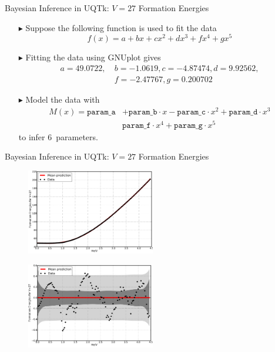 \documentclass[10pt]{beamer}
\begin{document}
\begin{frame}{Bayesian Inference in UQTk: $V = 27$ Formation Energies}
	\large
	    \begin{itemize}
    	\item[$\blacktriangleright$] Suppose the following function is used to fit
    	the data
    	$$f(x) = a + b x + c x^2 + d x^3 + f x^4 + g x^5$$
    	\item[$\blacktriangleright$] Fitting the data using GNUplot gives
    	\begin{align*}
    	a = 49.0722,~&b = -1.0619, c = -4.87474, d = 9.92562, \\
    	&f = -2.47767, g = 0.200702
    	\end{align*}
    	\item[$\blacktriangleright$] Model the data with
    	\begin{align*}
    	M(x) = \texttt{param\_a} &+ \texttt{param\_b} \cdot x - \texttt{param\_c}
    	\cdot x^2 + \texttt{param\_d} \cdot x^3 \\
    	 & \texttt{param\_f} \cdot x^4 + \texttt{param\_g} \cdot x^5
    	\end{align*}
    	to infer $6$~parameters.
    \end{itemize}
\end{frame}

\begin{frame}{Bayesian Inference in UQTk: $V = 27$ Formation Energies}
     \begin{figure}
         \includegraphics[width=0.5\textwidth]{prob5_postpred}
     \end{figure}
     
     \begin{figure}
         \includegraphics[width=0.5\textwidth]{prob5_postpred_noise}
     \end{figure}
\end{frame}
\end{document}
